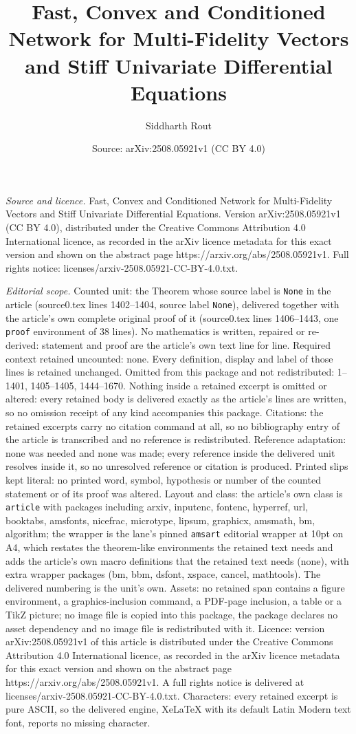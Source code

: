 \documentclass[10pt,a4paper]{amsart}
\title[Fast, Convex and Conditioned Network for Multi-Fidelity Vect]{Fast, Convex and Conditioned Network for Multi-Fidelity Vectors and Stiff Univariate Differential Equations}
\author{Siddharth Rout}
\date{Source: arXiv:2508.05921v1 (CC BY 4.0)}
\begin{document}
\maketitle

\noindent\emph{Source and licence.} Fast, Convex and Conditioned Network for Multi-Fidelity Vectors and Stiff Univariate Differential Equations. Version arXiv:2508.05921v1 (CC BY 4.0), distributed under the Creative Commons Attribution 4.0 International licence, as recorded in the arXiv licence metadata for this exact version and shown on the abstract page https://arxiv.org/abs/2508.05921v1. Full rights notice: licenses/arxiv-2508.05921-CC-BY-4.0.txt.\par\smallskip

\noindent\textit{Editorial scope.} Counted unit: the Theorem whose source label is \texttt{None} in the article (source0.tex lines 1402--1404, source label \texttt{None}), delivered together with the article's own complete original proof of it (source0.tex lines 1406--1443, one \texttt{proof} environment of 38 lines). No mathematics is written, repaired or re-derived: statement and proof are the article's own text line for line. Required context retained uncounted: none. Every definition, display and label of those lines is retained unchanged. Omitted from this package and not redistributed: 1--1401, 1405--1405, 1444--1670. Nothing inside a retained excerpt is omitted or altered: every retained body is delivered exactly as the article's lines are written, so no omission receipt of any kind accompanies this package. Citations: the retained excerpts carry no citation command at all, so no bibliography entry of the article is transcribed and no reference is redistributed. Reference adaptation: none was needed and none was made; every reference inside the delivered unit resolves inside it, so no unresolved reference or citation is produced. Printed slips kept literal: no printed word, symbol, hypothesis or number of the counted statement or of its proof was altered. Layout and class: the article's own class is \texttt{article} with packages including arxiv, inputenc, fontenc, hyperref, url, booktabs, amsfonts, nicefrac, microtype, lipsum, graphicx, amsmath, bm, algorithm; the wrapper is the lane's pinned \texttt{amsart} editorial wrapper at 10pt on A4, which restates the theorem-like environments the retained text needs and adds the article's own macro definitions that the retained text needs (none), with extra wrapper packages (bm, bbm, dsfont, xspace, cancel, mathtools). The delivered numbering is the unit's own. Assets: no retained span contains a figure environment, a graphics-inclusion command, a PDF-page inclusion, a table or a TikZ picture; no image file is copied into this package, the package declares no asset dependency and no image file is redistributed with it. Licence: version arXiv:2508.05921v1 of this article is distributed under the Creative Commons Attribution 4.0 International licence, as recorded in the arXiv licence metadata for this exact version and shown on the abstract page https://arxiv.org/abs/2508.05921v1. A full rights notice is delivered at licenses/arxiv-2508.05921-CC-BY-4.0.txt. Characters: every retained excerpt is pure ASCII, so the delivered engine, XeLaTeX with its default Latin Modern text font, reports no missing character.
\end{document}
